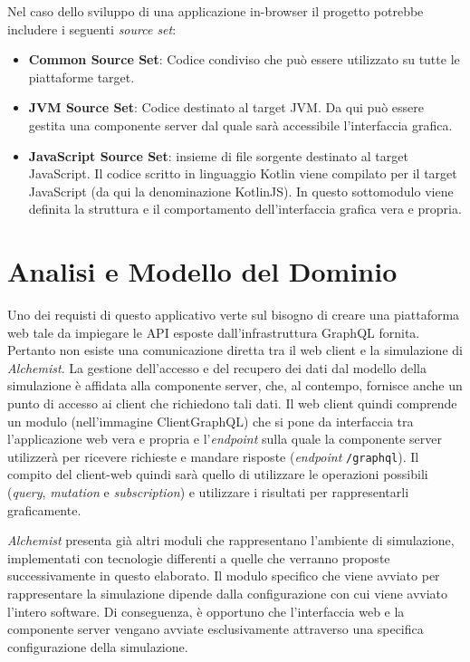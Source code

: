 Nel caso dello sviluppo di una applicazione in-browser il progetto potrebbe includere i seguenti \textit{source set}:
\begin{itemize}
	\item \textbf{Common Source Set}: Codice condiviso che può essere utilizzato su tutte le piattaforme target. 
	\item \textbf{JVM Source Set}: Codice destinato al target \ac{JVM}. Da qui può essere gestita una componente server dal quale sarà accessibile l'interfaccia grafica.
	\item \textbf{JavaScript Source Set}: insieme di file sorgente destinato al target JavaScript. Il codice scritto in linguaggio Kotlin viene compilato per il target JavaScript (da qui la denominazione KotlinJS). In questo sottomodulo viene definita la struttura e il comportamento dell'interfaccia grafica vera e propria.
\end{itemize}

\section{Analisi e Modello del Dominio}
Uno dei requisti di questo applicativo verte sul bisogno di creare una piattaforma web tale da impiegare le \ac{API} esposte dall'infrastruttura GraphQL fornita. Pertanto non esiste una comunicazione diretta tra il web client e la simulazione di \textit{Alchemist}. La gestione dell'accesso e del recupero dei dati dal modello della simulazione è affidata alla componente server, che, al contempo, fornisce anche un punto di accesso ai client che richiedono tali dati.
Il web client quindi comprende un modulo (nell'immagine ClientGraphQL) che si pone da interfaccia tra l'applicazione web vera e propria e l'\textit{endpoint } sulla quale la componente server utilizzerà per ricevere richieste e mandare risposte (\textit{endpoint} \texttt{/graphql}). 
Il compito del client-web quindi sarà quello di utilizzare le operazioni possibili (\textit{query}, \textit{mutation} e \textit{subscription}) e utilizzare i risultati per rappresentarli graficamente.

\textit{Alchemist} presenta già altri moduli che rappresentano l'ambiente di simulazione, implementati con tecnologie differenti a quelle che verranno proposte successivamente in questo elaborato. Il modulo specifico che viene avviato per rappresentare la simulazione dipende dalla configurazione con cui viene avviato l'intero software. Di conseguenza, è opportuno che l'interfaccia web e la componente server vengano avviate esclusivamente attraverso una specifica configurazione della simulazione.


